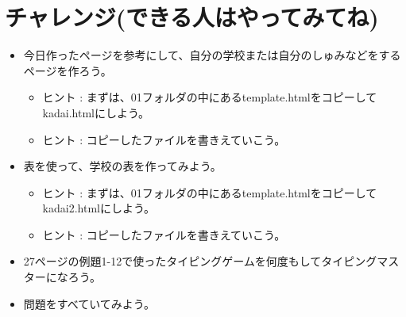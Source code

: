 \section{チャレンジ(できる人はやってみてね)}
\begin{itemize}
      \item
            今日作ったページを参考にして、自分の学校または自分のしゅみなどをするページを作ろう。

            \begin{itemize}
                  \item ヒント :
                        まずは、01フォルダの中にあるtemplate.htmlをコピーしてkadai.htmlにしよう。
                  \item ヒント :
                        コピーしたファイルを書きえていこう。
            \end{itemize}
      \item
            表を使って、学校の表を作ってみよう。

            \begin{itemize}
                  \item ヒント :
                        まずは、01フォルダの中にあるtemplate.htmlをコピーしてkadai2.htmlにしよう。
                  \item ヒント :
                        コピーしたファイルを書きえていこう。
            \end{itemize}
      \item
            27ページの例題1-12で使ったタイピングゲームを何度もしてタイピングマスターになろう。
      \item 問題をすべていてみよう。
\end{itemize}